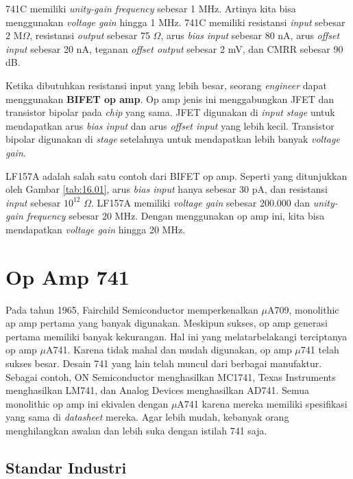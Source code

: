 741C memiliki \textit{unity-gain frequency} sebesar 1 MHz. Artinya kita bisa menggunakan \textit{voltage gain} hingga 1 MHz. 741C memiliki resistansi \textit{input} sebesar 2 M$\Omega$, resistansi \textit{output} sebesar 75 $\Omega$, arus \textit{bias} \textit{input} sebesar 80 nA, arus \textit{offset} \textit{input} sebesar 20 nA, teganan \textit{offset output} sebesar 2 mV, dan CMRR sebesar 90 dB.

Ketika dibutuhkan resistansi input yang lebih besar, seorang \textit{engineer} dapat menggunakan \textbf{BIFET op amp}. Op amp jenis ini menggabungkan JFET dan transistor bipolar pada \textit{chip} yang sama. JFET digunakan di \textit{input stage} untuk mendapatkan arus \textit{bias input} dan arus \textit{offset input} yang lebih kecil. Transistor bipolar digunakan di \textit{stage} setelahnya untuk mendapatkan lebih banyak \textit{voltage gain}.

LF157A adalah salah satu contoh dari BIFET op amp. Seperti yang ditunjukkan oleh Gambar \ref{tab:16.01}, arus \textit{bias input} hanya sebesar 30 pA, dan resistansi \textit{input} sebesar $ 10^{12} $ $\Omega$. LF157A memiliki \textit{voltage gain} sebesar 200.000 dan \textit{unity-gain frequency} sebesar 20 MHz. Dengan menggunakan op amp ini, kita bisa mendapatkan \textit{voltage gain} hingga 20 MHz.


\section{Op Amp 741}

Pada tahun 1965, Fairchild Semiconductor memperkenalkan $\mu$A709, monolithic ap amp pertama yang banyak digunakan. Meskipun sukses, op amp generasi pertama memiliki banyak kekurangan. Hal ini yang melatarbelakangi terciptanya op amp $\mu$A741. Karena tidak mahal dan mudah digunakan, op amp $\mu$741 telah sukses besar. Desain 741 yang lain telah muncul dari berbagai manufaktur. Sebagai contoh, ON Semiconductor menghasilkan MC1741, Texas Instruments menghasilkan LM741, dan Analog Devices menghasilkan AD741. Semua monolithic op amp ini ekivalen dengan $\mu$A741 karena mereka memiliki spesifikasi yang sama di \textit{datasheet} mereka. Agar lebih mudah, kebanyak orang menghilangkan awalan dan lebih suka dengan istilah 741 saja.


\subsection{Standar Industri}

